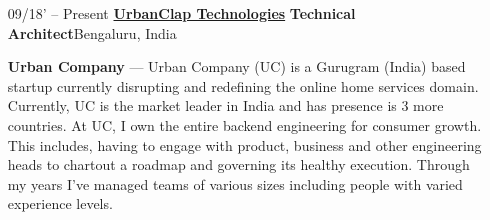\documentclass{article}
\begin{document}
\begin{itemize}[leftmargin=-1ex] \setlength\itemsep{0.25em}\vspace{5pt}
	
	
	\item[09/18' – Present] \href{https://urbanclap.com/}{\textbf{UrbanClap Technologies}} \textbf{Technical Architect}\hfill Bengaluru, India
	
	\item[]  \textbf{Urban Company} --- Urban Company (UC) is a Gurugram (India) based startup currently disrupting and redefining the online home services domain. Currently, UC is the market leader in India and has presence is 3 more countries. At UC, I own the entire backend engineering for consumer growth. This includes, having to engage with product, business and other engineering heads to chartout a roadmap and governing its healthy execution. Through my years I've managed teams of various sizes including people with varied experience levels. \vspace{5pt}
	
	\begin{itemize} \setlength\itemsep{0.5em}
		

\end{itemize}
\end{itemize}
\end{document}
